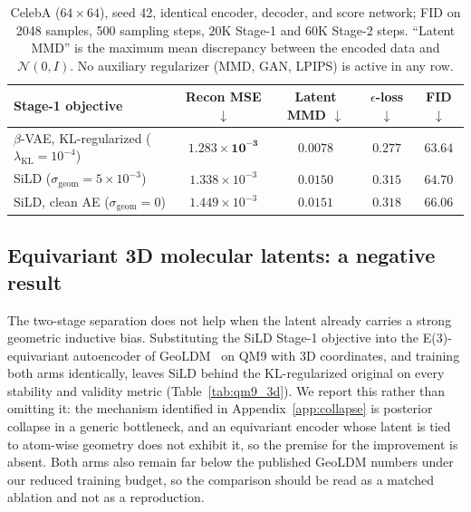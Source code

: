 \begin{table}[h]
\centering
\caption{%
CelebA ($64\times64$), seed 42, identical encoder, decoder, and score network;
FID on 2048 samples, 500 sampling steps, $20$K Stage-1 and $60$K Stage-2
steps. ``Latent MMD'' is the maximum mean discrepancy between the encoded
data and $\mathcal N(0,I)$. No auxiliary regularizer (MMD, GAN, LPIPS) is
active in any row.%
}
\label{tab:celeba_boundary}
\small
\begin{tabular}{lcccc}
\toprule
Stage-1 objective & Recon MSE $\downarrow$ & Latent MMD $\downarrow$ & $\epsilon$-loss $\downarrow$ & FID $\downarrow$ \\
\midrule
$\beta$-VAE, KL-regularized ($\lambda_{\mathrm{KL}}=10^{-4}$) & $\mathbf{1.283\!\times\!10^{-3}}$ & $\mathbf{0.0078}$ & $\mathbf{0.277}$ & $\mathbf{63.64}$ \\
SiLD ($\sigma_{\mathrm{geom}}=5\!\times\!10^{-3}$)            & $1.338\!\times\!10^{-3}$ & $0.0150$ & $0.315$ & $64.70$ \\
SiLD, clean AE ($\sigma_{\mathrm{geom}}=0$)                   & $1.449\!\times\!10^{-3}$ & $0.0151$ & $0.318$ & $66.06$ \\
\bottomrule
\end{tabular}
\end{table}

\subsection{Equivariant 3D molecular latents: a negative result}
\label{app:3d}

The two-stage separation does not help when the latent already carries a
strong geometric inductive bias. Substituting the SiLD Stage-1 objective into
the E(3)-equivariant autoencoder of GeoLDM~\cite{xu2023geometric} on QM9 with
3D coordinates, and training both arms identically, leaves SiLD behind the
KL-regularized original on every stability and validity metric
(Table~\ref{tab:qm9_3d}). We report this rather than omitting it: the
mechanism identified in Appendix~\ref{app:collapse} is posterior collapse in
a generic bottleneck, and an equivariant encoder whose latent is tied to
atom-wise geometry does not exhibit it, so the premise for the improvement is
absent. Both arms also remain far below the published GeoLDM numbers under
our reduced training budget, so the comparison should be read as a matched
ablation and not as a reproduction.

